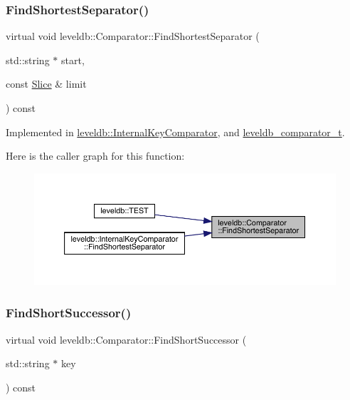 \subsubsection{\texorpdfstring{FindShortestSeparator()}{FindShortestSeparator()}}
{\footnotesize\ttfamily virtual void leveldb\+::\+Comparator\+::\+Find\+Shortest\+Separator (\begin{DoxyParamCaption}\item[{std\+::string $\ast$}]{start,  }\item[{const \mbox{\hyperlink{classleveldb_1_1_slice}{Slice}} \&}]{limit }\end{DoxyParamCaption}) const\hspace{0.3cm}{\ttfamily [pure virtual]}}



Implemented in \mbox{\hyperlink{classleveldb_1_1_internal_key_comparator_a876984ae99b1404b4074be4d92cab421}{leveldb\+::\+Internal\+Key\+Comparator}}, and \mbox{\hyperlink{structleveldb__comparator__t_ad5bc952c5129d060c1ffe7a830eb3820}{leveldb\+\_\+comparator\+\_\+t}}.

Here is the caller graph for this function\+:
\nopagebreak
\begin{figure}[H]
\begin{center}
\leavevmode
\includegraphics[width=350pt]{structleveldb_1_1_comparator_abdfe6076225e95b91ffd94f646063115_icgraph}
\end{center}
\end{figure}
\mbox{\label{structleveldb_1_1_comparator_a49751dd906595633161dfad943d24b3b}} 
\subsubsection{\texorpdfstring{FindShortSuccessor()}{FindShortSuccessor()}}
{\footnotesize\ttfamily virtual void leveldb\+::\+Comparator\+::\+Find\+Short\+Successor (\begin{DoxyParamCaption}\item[{std\+::string $\ast$}]{key }\end{DoxyParamCaption}) const\hspace{0.3cm}{\ttfamily [pure virtual]}}




